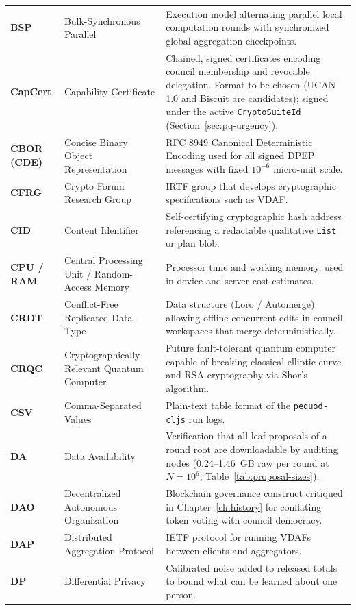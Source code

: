 \documentclass[10pt,twoside,openany]{book}
\theoremstyle{dpepstyle}
\begin{document}
{\begin{longtable}{L{0.92in} L{1.75in} L{1.95in}}
\textbf{BSP} & Bulk-Synchronous Parallel & Execution model alternating parallel local computation rounds with synchronized global aggregation checkpoints. \\
\textbf{CapCert} & Capability Certificate & Chained, signed certificates encoding council membership and revocable delegation. Format to be chosen (UCAN 1.0 and Biscuit are candidates); signed under the active \texttt{CryptoSuiteId} (Section~\ref{sec:pq-urgency}). \\
\textbf{CBOR (CDE)} & Concise Binary Object Representation & RFC 8949 Canonical Deterministic Encoding used for all signed DPEP messages with fixed $10^{-6}$ micro-unit scale. \\
\textbf{CFRG} & Crypto Forum Research Group & IRTF group that develops cryptographic specifications such as VDAF. \\
\textbf{CID} & Content Identifier & Self-certifying cryptographic hash address referencing a redactable qualitative \texttt{List} or plan blob. \\
\textbf{CPU / RAM} & Central Processing Unit / Random-Access Memory & Processor time and working memory, used in device and server cost estimates. \\
\textbf{CRDT} & Conflict-Free Replicated Data Type & Data structure (Loro / Automerge) allowing offline concurrent edits in council workspaces that merge deterministically. \\
\textbf{CRQC} & Cryptographically Relevant Quantum Computer & Future fault-tolerant quantum computer capable of breaking classical elliptic-curve and RSA cryptography via Shor's algorithm. \\
\textbf{CSV} & Comma-Separated Values & Plain-text table format of the \texttt{pequod-cljs} run logs. \\
\textbf{DA} & Data Availability & Verification that all leaf proposals of a round root are downloadable by auditing nodes (0.24--1.46~GB raw per round at $N=10^6$; Table~\ref{tab:proposal-sizes}). \\
\textbf{DAO} & Decentralized Autonomous Organization & Blockchain governance construct critiqued in Chapter~\ref{ch:history} for conflating token voting with council democracy. \\
\textbf{DAP} & Distributed Aggregation Protocol & IETF protocol for running VDAFs between clients and aggregators. \\
\textbf{DP} & Differential Privacy & Calibrated noise added to released totals to bound what can be learned about one person. \\

\end{longtable}}
\end{document}
